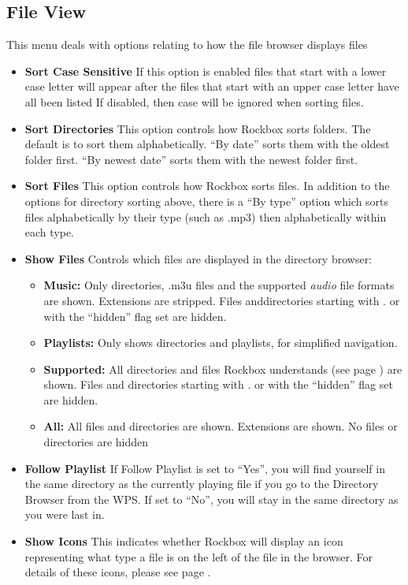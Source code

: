 \subsection{File View}
  This menu deals with options relating to how the file browser displays files
  
  \begin{itemize}
  \item \textbf{Sort Case Sensitive}
    If this option is enabled files that start with a lower case letter will appear after the files that start with an upper case letter have all been listed  If disabled, then case will be ignored when sorting files.
  \item \textbf{Sort Directories}
    This option controls how Rockbox sorts folders.  The default is to sort them alphabetically.  ``By date'' sorts them with the oldest folder first.  ``By newest date'' sorts them with the newest folder first.
    
  \item \textbf{Sort Files}
    This option controls how Rockbox sorts files.  In addition to the options for directory sorting above, there is a ``By type'' option which sorts files alphabetically by their type (such as .mp3) then alphabetically within each type.
    
  \item \textbf{\label{ref:ShowFiles}Show Files}
    Controls which files are displayed in the directory browser:
    
    \begin{itemize}
    \item \textbf{Music: }
      Only directories, .m3u files and the supported \emph{audio} file formats are shown. Extensions are stripped. Files anddirectories starting with . or with the ``hidden'' flag set are hidden.
    \item \textbf{Playlists:} 
      Only shows directories and playlists, for simplified navigation.
    \item \textbf{Supported:} 
      All directories and files Rockbox understands (see page \pageref{ref:Supportedfileformats}) are shown. Files and directories starting with . or with the ``hidden'' flag set are hidden.
    \item \textbf{All:}
      All files and directories are shown. Extensions are shown. No files or directories are hidden
    \end{itemize}
    
  \item \textbf{Follow Playlist}
    If Follow Playlist is set to ``Yes'', you will find yourself in the same directory as the currently playing file if you go to the Directory Browser from the WPS. If set to ``No'', you will stay in the same directory as you were last in.
    
  \item \textbf{Show Icons}
    This indicates whether Rockbox will display an icon representing what type a file is on the left of the file in the browser.  For details of these icons, please see page \pageref{ref:Supportedfileformats}.
  \end{itemize}
 